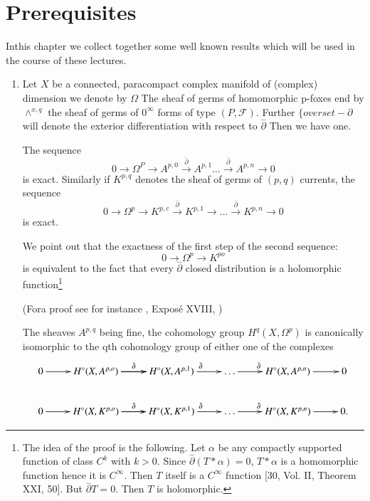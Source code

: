 \setcounter{chapter}{-1}
\chapter{Prerequisites}%

In\pageoriginale this chapter we collect together some well known
results which will be used in the course of these lectures. 

\begin{enumerate}
\renewcommand{\labelenumi}{\bf\theenumi.}
\item Let $X$ be a connected, paracompact complex manifold of (complex)
dimension we denote by $\Omega$ The sheaf of germs of homomorphic
p-foxes end by $\wedge^{x,q}$ the sheaf of germs of $0^\infty$ forms
of type $(P,\mathcal{F})$. Further $\{overset{-}{\partial}$ will denote
the exterior differentiation with respect to $\overset{-}{\partial}$
Then we have one. 

\begin{prop*} 
  The sequence
  $$
  0\rightarrow \Omega^P \rightarrow A^{p,0}
  \overset{\bar{\partial}}{\rightarrow} A^{p,1} \ldots
  \overset{\bar{\partial}}{\rightarrow} A^{p,n} \to 0 
  $$
  is exact. Similarly if $K^{p,q}$ denotes the sheaf of germs of $(p,q)$
  currents, the sequence 
  $$
  0\rightarrow \Omega^p \rightarrow K^{p,c}
  \overset{\bar{\partial}}{\rightarrow}K^{p,1}\rightarrow \ldots
  \overset{\bar{\partial}}{\rightarrow} K^{p,n}\rightarrow 0 
  $$
  is exact.
\end{prop*}

We point out that the exactness of the first step of the second 
sequence:
$$
0\rightarrow \Omega^p\rightarrow K^{po}
$$
is equivalent to the fact that every $\overset{-}{\partial}$ closed
distribution is a holomorphic function\footnote{The idea of the proof
  is the following. Let $\alpha$ be any compactly supported function
  of class $C^k$ with $k > 0$. Since
  $\overset{-}{\partial}(T*\alpha)=0$, $T*\alpha$ is a homomorphic
  function hence it is $C^\infty$. Then $T$ itself  is a $C^\infty$ function 
  [30, Vol. II, Theorem XXI, 50]. But  $\overset{-}{\partial} T =
  0$. Then $T$ is holomorphic.}   

(For\pageoriginale a proof see  for instance \cite{key5},
Expos\'e  XVIII,  \cite{key22})  

The sheaves  $A^{p,q}$ being fine, the cohomology group
$H^q(X,\Omega^p)$ is canonically isomorphic to the qth cohomology
group of either one of the complexes 
{\fontsize{7}{9}\selectfont
\[
\xymatrix{0 \ar[r]& \ar[r] H^\circ (X, A^{p, o})  \ar[r]^{\bar{\partial}} &
  H^\circ (X, A ^{p, 1})  \ar[r]^{\bar{\partial}} & \ldots 
  \ar[r]^{\bar{\partial}}&  H^\circ (X, A^{p, n})  \ar[r]& 0\\
0 \ar[r] & \ar[r] H^\circ (X, K^{p, o})  \ar[r]^{\bar{\partial}} &
  H^\circ (X, K^{p, 1})  \ar[r]^{\bar{\partial}} & \ldots 
  \ar[r]^{\bar{\partial}} &  H^\circ (X, K^{p, n}) \ar[r]& 0.
}
\]}\relax


\end{enumerate}
